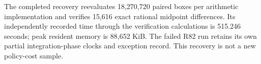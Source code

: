 The completed recovery reevaluates 18,270,720 paired boxes per arithmetic implementation and verifies 15,616 exact rational midpoint differences. Its independently recorded time through the verification calculations is 515.246 seconds; peak resident memory is 88,652 KiB. The failed R82 run retains its own partial integration-phase clocks and exception record. This recovery is not a new policy-cost sample.
